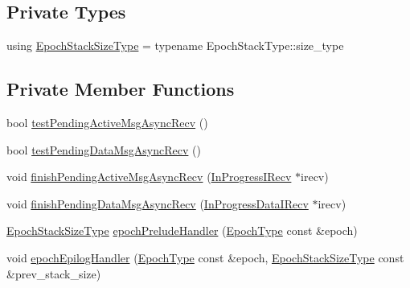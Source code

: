 \subsection*{Private Types}
\begin{DoxyCompactItemize}
\item 
using \hyperlink{structvt_1_1messaging_1_1_active_messenger_a447c6c0b3387142fd14b26c12e3ed877}{Epoch\+Stack\+Size\+Type} = typename Epoch\+Stack\+Type\+::size\+\_\+type
\end{DoxyCompactItemize}
\subsection*{Private Member Functions}
\begin{DoxyCompactItemize}
\item 
bool \hyperlink{structvt_1_1messaging_1_1_active_messenger_a12133fda914a7809ac7ce7694efc312e}{test\+Pending\+Active\+Msg\+Async\+Recv} ()
\item 
bool \hyperlink{structvt_1_1messaging_1_1_active_messenger_ae8e94c46cd2948864a97a671428b64bc}{test\+Pending\+Data\+Msg\+Async\+Recv} ()
\item 
void \hyperlink{structvt_1_1messaging_1_1_active_messenger_a162667e5566546402f12baf8cf60d4da}{finish\+Pending\+Active\+Msg\+Async\+Recv} (\hyperlink{structvt_1_1messaging_1_1_in_progress_i_recv}{In\+Progress\+I\+Recv} $\ast$irecv)
\item 
void \hyperlink{structvt_1_1messaging_1_1_active_messenger_a80a13017308870133ff8538741bee394}{finish\+Pending\+Data\+Msg\+Async\+Recv} (\hyperlink{structvt_1_1messaging_1_1_in_progress_data_i_recv}{In\+Progress\+Data\+I\+Recv} $\ast$irecv)
\item 
\hyperlink{structvt_1_1messaging_1_1_active_messenger_a447c6c0b3387142fd14b26c12e3ed877}{Epoch\+Stack\+Size\+Type} \hyperlink{structvt_1_1messaging_1_1_active_messenger_a8209c23bddf111089f4fd64d7cd2f67e}{epoch\+Prelude\+Handler} (\hyperlink{namespacevt_a985a5adf291c34a3ca263b3378388236}{Epoch\+Type} const \&epoch)
\item 
void \hyperlink{structvt_1_1messaging_1_1_active_messenger_a6418078d6eba01bfd36e46d54c076713}{epoch\+Epilog\+Handler} (\hyperlink{namespacevt_a985a5adf291c34a3ca263b3378388236}{Epoch\+Type} const \&epoch, \hyperlink{structvt_1_1messaging_1_1_active_messenger_a447c6c0b3387142fd14b26c12e3ed877}{Epoch\+Stack\+Size\+Type} const \&prev\+\_\+stack\+\_\+size)
\end{DoxyCompactItemize}
